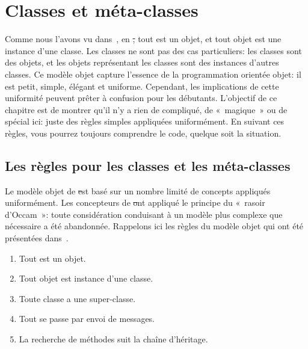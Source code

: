 \documentclass[a4paper,10pt,twoside]{book}
\begin{document}
	\renewcommand{\nnbb}[2]{} %
	\sloppy
\fi
\chapter{Classes et méta-classes}
\label{cha:metaclasses}


Comme nous l'avons vu dans~, en \st, tout est un objet, et tout objet est une instance d'une classe.
Les classes ne sont pas des cas particuliers:
les classes sont des objets, et les objets représentant les classes sont des instances d'autres classes.
Ce modèle objet capture l'essence de la programmation orientée objet: il est petit, simple, élégant et uniforme.
Cependant, les implications de cette uniformité peuvent prêter à confusion pour les débutants.
L'objectif de ce chapitre est de montrer qu'il n'y a rien de compliqué, de «~magique~» ou de spécial ici: juste des règles simples appliquées uniformément. 
En suivant ces règles, vous pourrez toujours comprendre le code, quelque soit la situation.

\section{Les règles pour les classes et les méta-classes}

Le modèle objet de \st est basé sur un nombre limité de concepts appliqués uniformément.
Les concepteurs de \st ont appliqué le principe du «~rasoir d'Occam~»: toute considération conduisant à un modèle plus complexe que nécessaire a été abandonnée.
Rappelons ici les règles du modèle objet qui ont été présentées dans~.

\begin{enumerate}[label={\textbf{Règle \arabic{*}}.}, ref={la règle~\arabic{*}}, leftmargin=*, widest=10]
\item{} %
	Tout est un objet.

\item{} %
	Tout objet est instance d'une classe.

\item{} %
	Toute classe a une super-classe.

\item{} %
	Tout se passe par envoi de messages. 

\item{} %
	La recherche de méthodes suit la chaîne d'héritage.
\end{enumerate}
\end{document}
